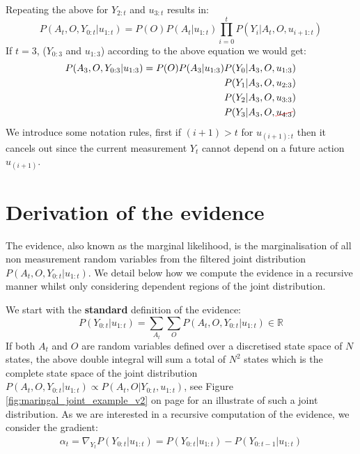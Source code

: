 \begin{appendices}
Repeating the above for $Y_{2:t}$ and $u_{3:t}$ results in:
\begin{equation}
 P(A_t,O,Y_{0:t}|u_{1:t}) = P(O)P(A_t|u_{1:t}) \prod_{i=0}^{t} P(Y_i|A_t,O,u_{i+1:t})
\end{equation}
If $t=3$, ($Y_{0:3}$ and $u_{1:3}$) according to the above equation we would get:
\begin{align}
 P(A_3,O,Y_{0:3}|u_{1:3}) = P(O)P(A_3|u_{1:3}) &P(Y_0|A_3,O,u_{1:3}) \nonumber \\
					       &P(Y_1|A_3,O,u_{2:3}) \nonumber \\
					       &P(Y_2|A_3,O,u_{3:3}) \nonumber \\
					       &P(Y_3|A_3,O,\Ccancel[red]{u_{4:3}})
\end{align}
We introduce some notation rules, first if $(i+1) > t$ for $u_{(i+1):t}$ then it cancels out since the current
measurement $Y_t$ cannot depend on a future action $u_{(i+1)}$.

\section{Derivation of the evidence}\label{appendix:evidence}


The evidence, also known as the marginal likelihood, is the marginalisation of all non measurement random variables from 
the filtered joint distribution $P(A_t,O,Y_{0:t}|u_{1:t})$. We detail below how we compute the evidence in a recursive 
manner whilst only considering dependent regions of the joint distribution.

We start with the \textbf{standard} definition of the evidence:
\begin{equation}\label{eq:ch5:numerator}
 P(Y_{0:t}|u_{1:t}) = \sum\limits_{A_t}\sum\limits_{O} P(A_t,O,Y_{0:t}|u_{1:t}) \in \mathbb{R}
\end{equation}
If both $A_t$ and $O$ are random variables defined over a discretised state space of $N$ states,
the above double integral will sum a total of $N^2$ states which is the complete state space of the 
joint distribution $P(A_t,O,Y_{0:t}|u_{1:t}) \propto  P(A_t,O|Y_{0:t},u_{1:t})$, see Figure \ref{fig:maringal_joint_example_v2} 
on page \pageref{fig:maringal_joint_example_v2} for an illustrate of such a joint distribution.
As we are interested in a recursive computation of the evidence, we consider the gradient:
\begin{align}
  \alpha_t = \nabla_{Y_t}P(Y_{0:t}|u_{1:t}) =  P(Y_{0:t}|u_{1:t}) - P(Y_{0:t-1}|u_{1:t})
\end{align}


\end{appendices}
